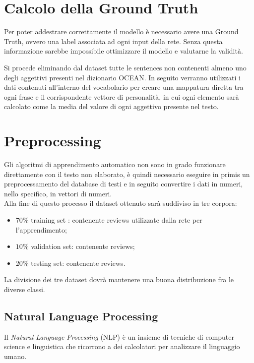 \section{Calcolo della Ground Truth}
\label{sec:GroundTruth}

Per poter addestrare correttamente il modello è necessario avere una Ground Truth, ovvero una label associata ad ogni input della rete. Senza questa informazione sarebbe impossibile ottimizzare il modello e valutarne la validità. 

Si procede eliminando dal dataset tutte le sentences non contenenti almeno uno degli aggettivi presenti nel dizionario OCEAN. In seguito verranno utilizzati i dati contenuti all'interno del vocabolario per creare una mappatura diretta tra ogni frase e il corrispondente vettore di personalità, in cui ogni elemento sarà calcolato come la media del valore di ogni aggettivo presente nel testo.

\section{Preprocessing}
\label{sec:preprocessing}
Gli algoritmi di apprendimento automatico non sono in grado funzionare direttamente con il testo non elaborato, è quindi necessario eseguire in primis un preprocessamento del database di testi e in seguito convertire i dati in numeri, nello specifico, in vettori di numeri.\\
Alla fine di questo processo il dataset ottenuto sarà suddiviso in tre corpora: 
\begin{itemize}
	\item $70\%$ training set : contenente  reviews utilizzate dalla rete per l'apprendimento;
	\item $10\%$ validation set: contenente  reviews;
	\item $20\%$ testing set: contenente  reviews.
\end{itemize}
La divisione dei tre dataset dovrà mantenere una buona distribuzione fra le diverse classi.

\subsection{Natural Language Processing}
\label{subsec:nlp}
Il \emph{Natural Language Processing} (NLP) è un insieme di tecniche di computer science e linguistica che ricorrono a dei calcolatori per analizzare il linguaggio umano.
\\

